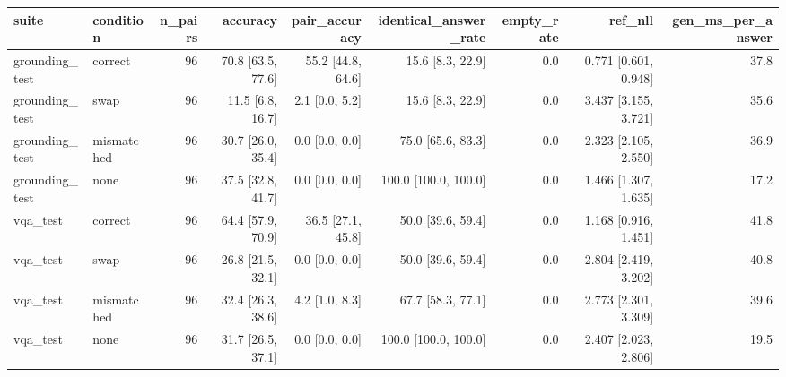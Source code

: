 \begin{tabular}{llrrrrrrr}
\toprule
suite & condition & n\_pairs & accuracy & pair\_accuracy & identical\_answer\_rate & empty\_rate & ref\_nll & gen\_ms\_per\_answer \\
\midrule
grounding\_test & correct & 96 & 70.8 [63.5, 77.6] & 55.2 [44.8, 64.6] & 15.6 [8.3, 22.9] & 0.0 & 0.771 [0.601, 0.948] & 37.8 \\
grounding\_test & swap & 96 & 11.5 [6.8, 16.7] & 2.1 [0.0, 5.2] & 15.6 [8.3, 22.9] & 0.0 & 3.437 [3.155, 3.721] & 35.6 \\
grounding\_test & mismatched & 96 & 30.7 [26.0, 35.4] & 0.0 [0.0, 0.0] & 75.0 [65.6, 83.3] & 0.0 & 2.323 [2.105, 2.550] & 36.9 \\
grounding\_test & none & 96 & 37.5 [32.8, 41.7] & 0.0 [0.0, 0.0] & 100.0 [100.0, 100.0] & 0.0 & 1.466 [1.307, 1.635] & 17.2 \\
vqa\_test & correct & 96 & 64.4 [57.9, 70.9] & 36.5 [27.1, 45.8] & 50.0 [39.6, 59.4] & 0.0 & 1.168 [0.916, 1.451] & 41.8 \\
vqa\_test & swap & 96 & 26.8 [21.5, 32.1] & 0.0 [0.0, 0.0] & 50.0 [39.6, 59.4] & 0.0 & 2.804 [2.419, 3.202] & 40.8 \\
vqa\_test & mismatched & 96 & 32.4 [26.3, 38.6] & 4.2 [1.0, 8.3] & 67.7 [58.3, 77.1] & 0.0 & 2.773 [2.301, 3.309] & 39.6 \\
vqa\_test & none & 96 & 31.7 [26.5, 37.1] & 0.0 [0.0, 0.0] & 100.0 [100.0, 100.0] & 0.0 & 2.407 [2.023, 2.806] & 19.5 \\
\bottomrule
\end{tabular}
